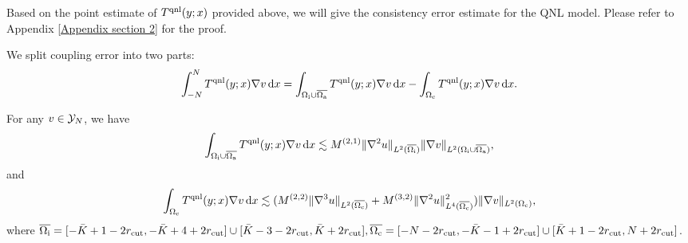 
Based on the point estimate of $T^{{\rm qnl}}(y;x)$ provided above, we will give the consistency error estimate for the QNL model. Please refer to Appendix \ref{Appendix section 2} for the proof.

\begin{proposition}\label{Coupling consistency error estimate}
	We split coupling error into two parts:
	\begin{equation*}
		\int_{-N}^{N}T^{{\rm qnl}}(y;x)\nabla v\,\text{d} x=\int_{\Omega_{{\rm i}}\cup\overline{\Omega_{{\rm a}}}}T^{{\rm qnl}}(y;x)\nabla v\,\text{d} x-\int_{\Omega_{{\rm c}}}T^{{\rm qnl}}(y;x)\nabla v\,\text{d} x.
	\end{equation*}
	
	For any $v\in \mathcal{Y}_{N}$, we have
	\begin{equation}\label{Interface region stress tensor}
		\int_{\Omega_{{\rm i}}\cup\overline{\Omega_{{\rm a}}}}T^{{\rm qnl}}(y;x)\nabla v\,\text{d} x \lesssim M^{(2,1)}\Vert\nabla^{2}u\Vert_{L^{2}(\overline{\Omega_{{\rm i}}})}\Vert\nabla v\Vert_{L^{2}(\Omega_{{\rm i}}\cup\overline{\Omega_{{\rm a}}})},
	\end{equation}
	and
	\begin{equation}\label{Continuum region stress tensor}
		\int_{\Omega_{{\rm c}}}T^{{\rm qnl}}(y;x)\nabla v\,\text{d} x \lesssim(M^{(2,2)}\Vert \nabla^{3}u\Vert_{L^{2}(\overline{\Omega_{{\rm c}}})}+M^{(3,2)}\Vert \nabla^{2}u\Vert_{L^{4}(\overline{\Omega_{{\rm c}}})}^{2})\Vert\nabla v\Vert_{L^{2}(\Omega_{{\rm c}})},
	\end{equation}
	where $\overline{\Omega_{{\rm i}}} = [-\bar{K}+1-2r_{{\rm cut}},-\bar{K}+4+2r_{{\rm cut}}]\cup[\bar{K}-3-2r_{{\rm cut}},\bar{K}+2r_{{\rm cut}}], \overline{\Omega_{{\rm c}}}=[-N-2r_{{\rm cut}},-\bar{K}-1+2r_{{\rm cut}}]\cup[\bar{K}+1-2r_{{\rm cut}},N+2r_{{\rm cut}}]$.
\end{proposition}

	

	
	
